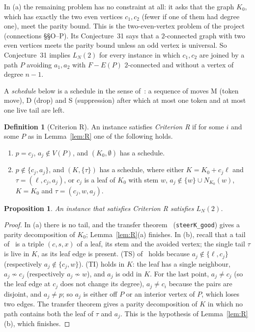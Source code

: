 \documentclass[11pt]{amsart}
\newtheorem{proposition}[theorem]{Proposition}
\theoremstyle{definition}
\newtheorem{definition}[theorem]{Definition}
\begin{document}
In (a) the remaining problem has no constraint at all: it asks that the graph $K_0$, which has
exactly the two even vertices $c_1,c_2$ (fewer if one of them had degree one), meet the parity bound.
This is the two-even-vertex problem of the project (connections \S\S O--P). Its Conjecture~31 says
that a $2$-connected graph with two even vertices meets the parity bound unless an odd vertex is
universal. So Conjecture~31 implies $L_N(2)$ for every instance in which $c_1,c_2$ are joined by a
path $P$ avoiding $a_1,a_2$ with $F-E(P)$ $2$-connected and without a vertex of degree $n-1$.

A \emph{schedule} below is a schedule in the sense of~\cite[Def.~2.2]{MT}: a sequence of moves M
(token move), D (drop) and S (suppression) after which at most one token and at most one live tail
are left.

\begin{definition}[Criterion R]\label{def:R}
An instance satisfies \emph{Criterion R} if for some $i$ and some $P$ as in Lemma~\ref{lem:R} one of
the following holds.
\begin{enumerate}[label=(\alph*)]
\item $p=c_j$, $a_j\notin V(P)$, and $(K_0,\emptyset)$ has a schedule.
\item $p\notin\{c_j,a_j\}$, and $(K,\{\tau\})$ has a schedule, where either $K=K_0+c_j\ell$ and
$\tau=(\ell,c_j,a_j)$, or $c_j$ is a leaf of $K_0$ with stem $w$, $a_j\notin\{w\}\cup N_{K_0}(w)$,
$K=K_0$ and $\tau=(c_j,w,a_j)$.
\end{enumerate}
\end{definition}

\begin{proposition}\label{prop:R}
An instance that satisfies Criterion R satisfies $L_N(2)$.
\end{proposition}

\begin{proof}
In (a) there is no tail, and the transfer theorem~\cite[Thm.~2.7]{MT} (\texttt{steerK\_good}) gives
a parity decomposition of $K_0$; Lemma~\ref{lem:R}(a) finishes. In (b), recall that a tail
of~\cite[Def.~2.1]{MT} is a triple $(c,s,x)$ of a leaf, its stem and the avoided vertex; the single
tail $\tau$ is live in $K$, as its leaf edge is present. (TS) of~\cite{MT} holds because
$a_j\notin\{\ell,c_j\}$ (respectively $a_j\notin\{c_j,w\}$). (TI) holds in $K$: the leaf has a
single neighbour, $a_j\not\sim c_j$ (respectively $a_j\not\sim w$), and $a_j$ is odd in $K$. For the
last point, $a_j\ne c_j$ (so the leaf edge at $c_j$ does not change its degree), $a_j\ne c_i$
because the pairs are disjoint, and $a_j\ne p$; so $a_j$ is either off $P$ or an interior vertex of
$P$, which loses two edges. The transfer theorem gives a parity
decomposition of $K$ in which no path contains both the leaf of $\tau$ and $a_j$. This is the
hypothesis of Lemma~\ref{lem:R}(b), which finishes.
\end{proof}
\end{document}

